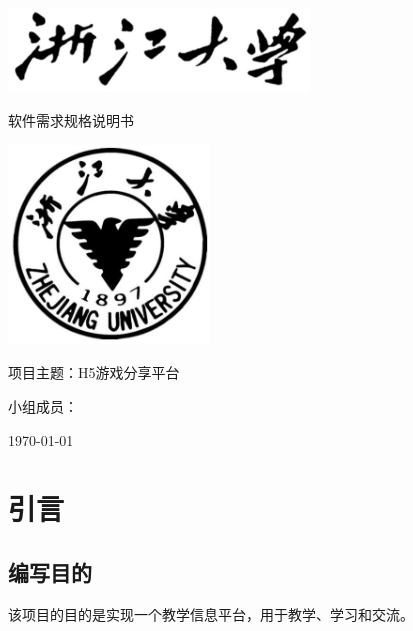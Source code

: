 \documentclass[12pt]{ctexart} %
\begin{document}
\begin{titlepage}
  \centering %
  \vspace*{2cm} %
  \includegraphics[width=0.6\textwidth]{zjutitle.jpg} %
  
  \vspace{2cm} %
  
  {\fontsize{36}{48}\selectfont{} 软件需求规格说明书} %
  
  \vspace{2cm} %
  
  \includegraphics[width=0.4\textwidth]{zjulogo.jpg} %
  
  \vspace{2cm}
  
  {\Huge{}  项目主题：H5游戏分享平台} %
  
  \vspace{1cm}

  {\Large{} 小组成员：} %
  
  \vspace{1cm} %
  
  {\Large{} \today} %

\end{titlepage}

\newpage
\tableofcontents %
\newpage

\section{引言}

\subsection{编写目的}
该项目的目的是实现一个教学信息平台，用于教学、学习和交流。
\end{document}

